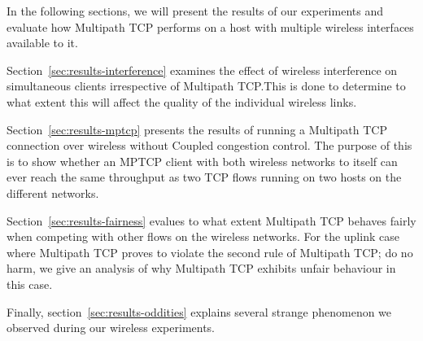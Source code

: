 In the following sections, we will present the results of our experiments and
evaluate how Multipath TCP performs on a host with multiple wireless
interfaces available to it.

Section~\ref{sec:results-interference} examines the effect of wireless
interference on simultaneous clients irrespective of Multipath TCP.\@ This is
done to determine to what extent this will affect the quality of the individual
wireless links.

Section~\ref{sec:results-mptcp} presents the results of running a Multipath TCP
connection over wireless without Coupled congestion control. The purpose of this
is to show whether an MPTCP client with both wireless networks to itself can
ever reach the same throughput as two TCP flows running on two hosts on
the different networks.

Section~\ref{sec:results-fairness} evalues to what extent Multipath TCP behaves
fairly when competing with other flows on the wireless networks. For the uplink
case where Multipath TCP proves to violate the second rule of Multipath TCP; do
no harm, we give an analysis of why Multipath TCP exhibits unfair behaviour in
this case.

Finally, section~\ref{sec:results-oddities} explains several strange phenomenon
we observed during our wireless experiments.
